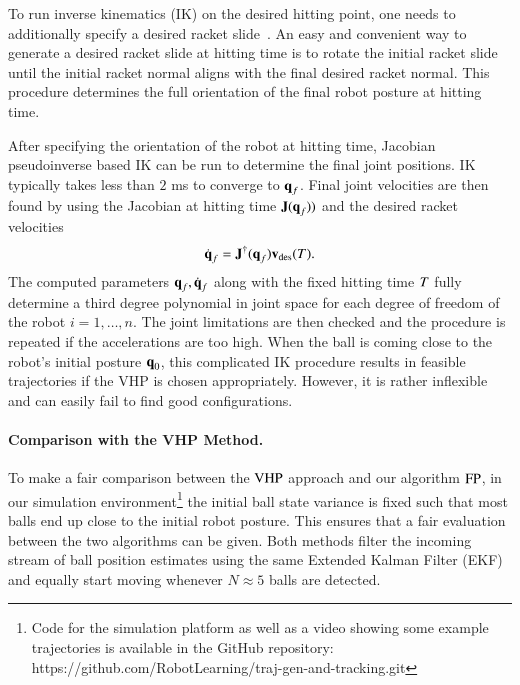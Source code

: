 To run inverse kinematics (IK) on the desired hitting point, one needs to additionally specify a desired racket slide~\citep{Spong06}. An easy and convenient way to generate a desired racket slide at hitting time is to rotate the initial racket slide until the initial racket normal aligns with the final desired racket normal. This procedure determines the full orientation of the final robot posture at hitting time.

After specifying the orientation of the robot at hitting time, Jacobian pseudoinverse based IK can be run to determine the final joint positions. 
IK typically takes less than $2$ ms to converge to $\boldsymbol{\mathrm{q}}_f$. Final joint velocities are then found by using the Jacobian at hitting time $\boldsymbol{\mathrm{J}}(\boldsymbol{\mathrm{q}}_f))$ and the desired racket velocities
%
\begin{align}
\dot{\boldsymbol{\mathrm{q}}}_f = \boldsymbol{\mathrm{J}}^{\dagger}(\boldsymbol{\mathrm{q}}_f)\boldsymbol{\mathrm{v}}_{\mathrm{des}}(T).
\end{align}
%
The computed parameters $\boldsymbol{\mathrm{q}}_f, \dot{\boldsymbol{\mathrm{q}}}_f$ along with the fixed hitting time $T$ fully determine a third degree polynomial in joint space for each degree of freedom of the robot $i = 1,\ldots,n$. The joint limitations are then checked and the procedure is repeated if the accelerations are too high. When the ball is coming close to the robot's initial posture $\boldsymbol{\mathrm{q}}_0$, this complicated IK procedure results in feasible trajectories if the VHP is chosen appropriately. However, it is rather inflexible and can easily fail to find good configurations. 

\paragraph{\textbf{Comparison with the VHP Method}.} To make a fair comparison between the $\mathrm{VHP}$ approach and our algorithm $\mathrm{FP}$, in our simulation environment\footnote{Code for the simulation platform as well as a video showing some example trajectories is available in the GitHub repository: https://github.com/RobotLearning/traj-gen-and-tracking.git} the initial ball state variance is fixed such that most balls end up close to the initial robot posture. This ensures that a fair evaluation between the two algorithms can be given. Both methods filter the incoming stream of ball position estimates using the same Extended Kalman Filter (EKF) and equally start moving whenever $N \approx 5$ balls are detected. 

